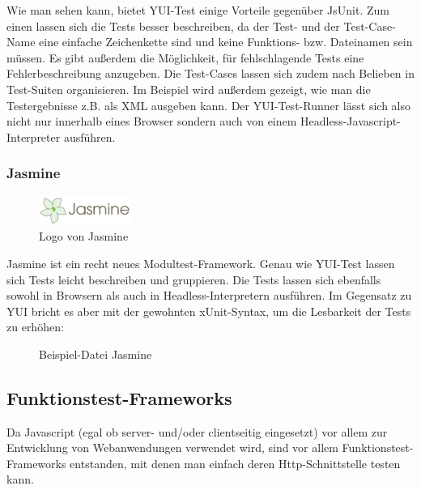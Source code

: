 Wie man sehen kann, bietet YUI-Test einige Vorteile gegenüber JsUnit. Zum einen lassen sich die Tests besser beschreiben, da der Test- und der Test-Case-Name eine einfache Zeichenkette sind und keine Funktions- bzw. Dateinamen sein müssen. Es gibt außerdem die Möglichkeit, für fehlschlagende Tests eine Fehlerbeschreibung anzugeben. Die Test-Cases lassen sich zudem nach Belieben in Test-Suiten organisieren. Im Beispiel wird außerdem gezeigt, wie man die Testergebnisse z.B. als XML ausgeben kann. Der YUI-Test-Runner lässt sich also nicht nur innerhalb eines Browser sondern auch von einem Headless-Javascript-Interpreter ausführen.

\subsubsection{Jasmine}

\begin{figure}[H]
	\begin{center}
		\includegraphics[width=3cm]{bilder/jasmine}
		\caption{Logo von Jasmine}
		\label{image:jasmine}
	\end{center}
\end{figure}

Jasmine ist ein recht neues Modultest-Framework. Genau wie YUI-Test lassen sich Tests leicht beschreiben und gruppieren. Die Tests lassen sich ebenfalls sowohl in Browsern als auch in Headless-Interpretern ausführen. Im Gegensatz zu YUI bricht es aber mit der gewohnten xUnit-Syntax, um die Lesbarkeit der Tests zu erhöhen:

\begin{figure}[H]
	\begin{center}
		\caption{Beispiel-Datei Jasmine}
		\label{code:jasmine}
	\end{center}
\end{figure}

\subsection{Funktionstest-Frameworks}

Da Javascript (egal ob server- und/oder clientseitig eingesetzt) vor allem zur Entwicklung von Webanwendungen verwendet wird, sind vor allem Funktionstest- Frameworks entstanden, mit denen man einfach deren Http-Schnittstelle testen kann.

